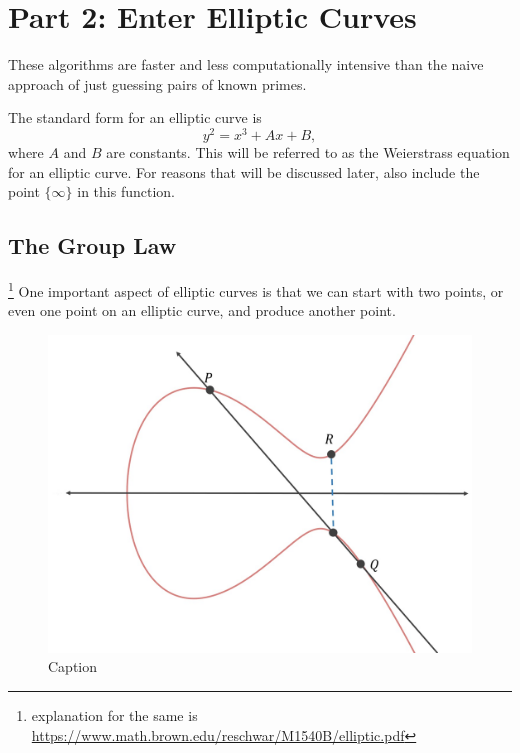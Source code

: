 \documentclass{article}
\begin{document}
\section*{Part 2: Enter Elliptic Curves}

These algorithms are faster and less computationally intensive than the naive approach of just guessing pairs of known primes.





The standard form for an elliptic curve is $$y^{2} = x^{3} + Ax + B,$$ where $A$ and $B$ are constants.  This will be referred to as the Weierstrass equation for an elliptic curve. For reasons that will be discussed later, also include the point $\{\infty\}$ in this function.

\subsection*{The Group Law}
\footnote{explanation for the same is \href{here}{https://www.math.brown.edu/reschwar/M1540B/elliptic.pdf}}
    One important aspect of elliptic curves is that we can start with two points, or even one point on an elliptic curve, and produce another point.

    \begin{figure}
        \centering
        \includegraphics[scale = 0.2]{sp23/hw-supplements/hw7-supp-scuffed/point_addition.jpeg}
        \caption{Caption}
        \label{fig:my_label}
    \end{figure}
\end{document}
